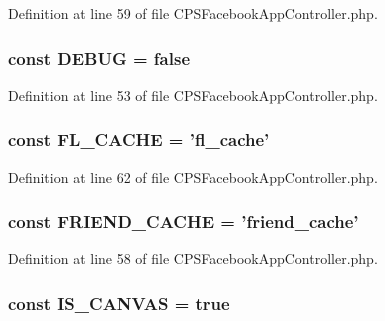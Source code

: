 Definition at line 59 of file CPSFacebookAppController.php.

\hypertarget{classCPSFacebookAppController_a758c150b67e476ecf77478f16b387c61}{
\subsubsection[{DEBUG}]{\setlength{\rightskip}{0pt plus 5cm}const {\bf DEBUG} = false}}
\label{classCPSFacebookAppController_a758c150b67e476ecf77478f16b387c61}


Definition at line 53 of file CPSFacebookAppController.php.

\hypertarget{classCPSFacebookAppController_a52c5815c1a32c4d4e554abd7c6071f56}{
\subsubsection[{FL\_\-CACHE}]{\setlength{\rightskip}{0pt plus 5cm}const {\bf FL\_\-CACHE} = 'fl\_\-cache'}}
\label{classCPSFacebookAppController_a52c5815c1a32c4d4e554abd7c6071f56}


Definition at line 62 of file CPSFacebookAppController.php.

\hypertarget{classCPSFacebookAppController_a33ac1db1c172ba0f5722c97f00af34d6}{
\subsubsection[{FRIEND\_\-CACHE}]{\setlength{\rightskip}{0pt plus 5cm}const {\bf FRIEND\_\-CACHE} = 'friend\_\-cache'}}
\label{classCPSFacebookAppController_a33ac1db1c172ba0f5722c97f00af34d6}


Definition at line 58 of file CPSFacebookAppController.php.

\hypertarget{classCPSFacebookAppController_a70840ece73140159e9b08da06002ae3a}{
\subsubsection[{IS\_\-CANVAS}]{\setlength{\rightskip}{0pt plus 5cm}const {\bf IS\_\-CANVAS} = true}}
\label{classCPSFacebookAppController_a70840ece73140159e9b08da06002ae3a}


